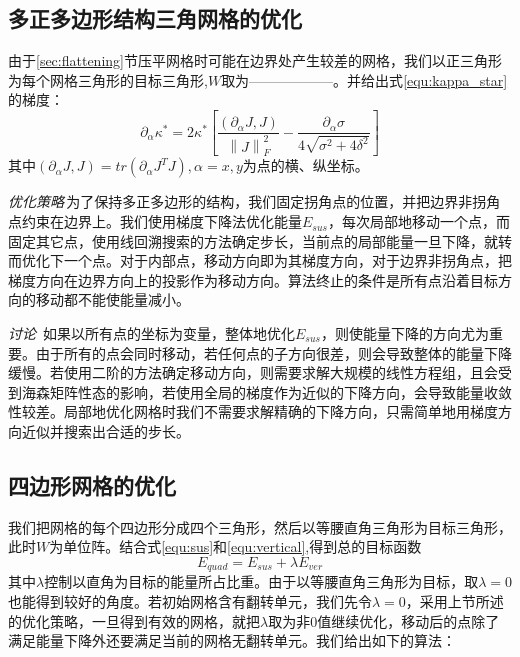 \subsection{多正多边形结构三角网格的优化} \label{sec:sus-poly}
由于\ref{sec:flattening}节压平网格时可能在边界处产生较差的网格，我们以正三角形为每个网格三角形的目标三角形,$W$取为——————。并给出式\ref{equ:kappa_star}的梯度：
\begin{equation}
\partial_\alpha \kappa^*=2\kappa^*
\left[
\frac{(\partial_\alpha J,J)}{\left\|J\right\|_F^2}
-\frac{\partial_\alpha \sigma}{4\sqrt{\sigma^2+4\delta^2}}
\right]
\end{equation}
其中$(\partial_\alpha J,J)=tr(\partial_\alpha J^TJ),\alpha=x,y$为点的横、纵坐标。

\emph{优化策略}\,为了保持多正多边形的结构，我们固定拐角点的位置，并把边界非拐角点约束在边界上。我们使用梯度下降法优化能量$E_{sus}$，每次局部地移动一个点，而固定其它点，使用线回溯搜索的方法确定步长，当前点的局部能量一旦下降，就转而优化下一个点。对于内部点，移动方向即为其梯度方向，对于边界非拐角点，把梯度方向在边界方向上的投影作为移动方向。算法终止的条件是所有点沿着目标方向的移动都不能使能量减小。

\emph{讨论}\, 如果以所有点的坐标为变量，整体地优化$E_{sus}$，则使能量下降的方向尤为重要。由于所有的点会同时移动，若任何点的子方向很差，则会导致整体的能量下降缓慢。若使用二阶的方法确定移动方向，则需要求解大规模的线性方程组，且会受到海森矩阵性态的影响，若使用全局的梯度作为近似的下降方向，会导致能量收敛性较差。局部地优化网格时我们不需要求解精确的下降方向，只需简单地用梯度方向近似并搜索出合适的步长。
\subsection{四边形网格的优化}\label{sec:sus-ver-quad}
我们把网格的每个四边形分成四个三角形，然后以等腰直角三角形为目标三角形，此时$W$为单位阵。结合式\ref{equ:sus}和\ref{equ:vertical},得到总的目标函数
\begin{equation} \label{equ:quadopt}
E_{quad}=E_{sus}+\lambda E_{ver}
\end{equation}
其中$\lambda$控制以直角为目标的能量所占比重。由于以等腰直角三角形为目标，取$\lambda=0$也能得到较好的角度。若初始网格含有翻转单元，我们先令$\lambda=0$，采用上节所述的优化策略，一旦得到有效的网格，就把$\lambda$取为非0值继续优化，移动后的点除了满足能量下降外还要满足当前的网格无翻转单元。我们给出如下的算法：

